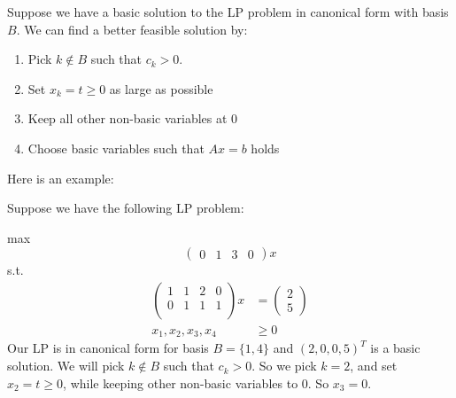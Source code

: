     \begin{definition}
        Suppose we have a basic solution to the LP problem in canonical form with basis $B$. We can find a better feasible solution by:
        \begin{enumerate}
            \item Pick $k \not \in B$ such that $c_k > 0$.
            \item Set $x_k = t \geq 0$ as large as possible
            \item Keep all other non-basic variables at 0
            \item Choose basic variables such that $Ax = b$ holds
        \end{enumerate}
        Here is an example:
    
        Suppose we have the following LP problem:
    
        max $$\begin{pmatrix}
                0 & 1 & 3 & 0
            \end{pmatrix}x$$
        s.t.
        \begin{align*}
            \begin{pmatrix}
                1 & 1 & 2 & 0 \\
                0 & 1 & 1 & 1 \\
            \end{pmatrix} x & = \begin{pmatrix}
                                    2 \\ 5
                                \end{pmatrix} \\
            x_1,x_2,x_3,x_4  & \geq 0
        \end{align*}
        Our LP is in canonical form for basis $B =\{1,4\}$ and $(2,0,0,5)^T$ is a basic solution. We will pick $k \not \in B$ such that $c_k > 0$. So we pick $k = 2$, and set $x_2 = t \geq 0$, while keeping other non-basic variables to 0. So $x_3 = 0$.
    

\end{definition}
